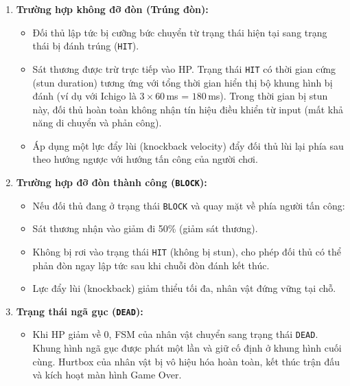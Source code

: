 \documentclass[a4paper,12pt]{report}
\begin{document}
\begin{enumerate}
    \item \textbf{Trường hợp không đỡ đòn (Trúng đòn):}
    \begin{itemize}
        \item Đối thủ lập tức bị cưỡng bức chuyển từ trạng thái hiện tại sang trạng thái bị đánh trúng (\texttt{HIT}).
        \item Sát thương được trừ trực tiếp vào HP. Trạng thái \texttt{HIT} có thời gian cứng (stun duration) tương ứng với tổng thời gian hiển thị bộ khung hình bị đánh (ví dụ với Ichigo là $3 \times 60$\,ms = $180$\,ms). Trong thời gian bị stun này, đối thủ hoàn toàn không nhận tín hiệu điều khiển từ input (mất khả năng di chuyển và phản công).
        \item Áp dụng một lực đẩy lùi (knockback velocity) đẩy đối thủ lùi lại phía sau theo hướng ngược với hướng tấn công của người chơi.
    \end{itemize}
    \item \textbf{Trường hợp đỡ đòn thành công (\texttt{BLOCK}):}
    \begin{itemize}
        \item Nếu đối thủ đang ở trạng thái \texttt{BLOCK} và quay mặt về phía người tấn công:
        \item Sát thương nhận vào giảm đi 50\% (giảm sát thương).
        \item Không bị rơi vào trạng thái \texttt{HIT} (không bị stun), cho phép đối thủ có thể phản đòn ngay lập tức sau khi chuỗi đòn đánh kết thúc.
        \item Lực đẩy lùi (knockback) giảm thiểu tối đa, nhân vật đứng vững tại chỗ.
    \end{itemize}
    \item \textbf{Trạng thái ngã gục (\texttt{DEAD}):}
    \begin{itemize}
        \item Khi HP giảm về 0, FSM của nhân vật chuyển sang trạng thái \texttt{DEAD}. Khung hình ngã gục được phát một lần và giữ cố định ở khung hình cuối cùng. Hurtbox của nhân vật bị vô hiệu hóa hoàn toàn, kết thúc trận đấu và kích hoạt màn hình Game Over.
    \end{itemize}
\end{enumerate}
\end{document}
